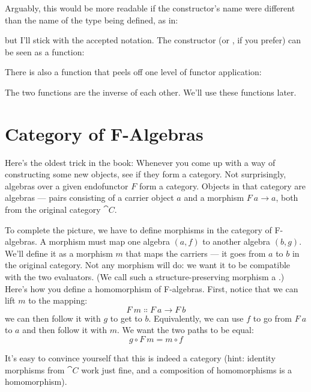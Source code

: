 Arguably, this would be more readable if the constructor's name were
different than the name of the type being defined, as in:

but I'll stick with the accepted notation. The constructor 
(or , if you prefer) can be seen as a function:

There is also a function that peels off one level of functor
application:

The two functions are the inverse of each other. We'll use these
functions later.

\section{Category of F-Algebras}

Here's the oldest trick in the book: Whenever you come up with a way of
constructing some new objects, see if they form a category. Not
surprisingly, algebras over a given endofunctor $F$ form a
category. Objects in that category are algebras --- pairs consisting of
a carrier object $a$ and a morphism
$F\ a \to a$, both from the original category
$\cat{C}$.

To complete the picture, we have to define morphisms in the category of
F-algebras. A morphism must map one algebra $(a, f)$ to another
algebra $(b, g)$. We'll define it as a morphism $m$ that
maps the carriers --- it goes from $a$ to $b$ in the
original category. Not any morphism will do: we want it to be compatible
with the two evaluators. (We call such a structure-preserving morphism a
.) Here's how you define a homomorphism of
F-algebras. First, notice that we can lift $m$ to the mapping:
\[F\ m \Colon F\ a \to F\ b\]
we can then follow it with $g$ to get to $b$.
Equivalently, we can use $f$ to go from $F\ a$ to
$a$ and then follow it with $m$. We want the two paths to
be equal:
\[g \circ F\ m = m \circ f\]

\begin{figure}[H]
\centering
{}
\end{figure}

\noindent
It's easy to convince yourself that this is indeed a category (hint:
identity morphisms from $\cat{C}$ work just fine, and a composition of
homomorphisms is a homomorphism).

